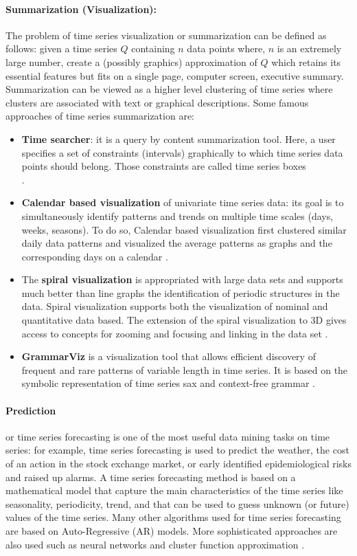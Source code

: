 \paragraph{Summarization (Visualization):}
The problem of time series visualization or summarization can be defined as follows: given a time series $Q$ containing $n$ data points where, $n$ is an extremely large number, create a (possibly graphics) approximation of $Q$ which retains its essential features but fits on a single page, computer screen, executive summary. Summarization can be viewed as a higher level clustering of time series  where clusters are associated with text or graphical descriptions. Some famous approaches of time series summarization  are:
\begin{itemize}

\item    \textbf{Time searcher}: it is a query by content summarization tool. Here, a user specifies a set of constraints (intervals) graphically to which time series data points should belong. Those constraints are called time series boxes \\ \cite{hochheiser2003interactive}.
\item    \textbf{Calendar based visualization} of univariate time series data: its goal is to simultaneously identify patterns and trends on multiple time scales (days, weeks, seasons). To do so, Calendar based visualization first clustered similar daily data patterns and visualized the average patterns as graphs and the corresponding days on a calendar \cite{van1999cluster}. 
\item    The \textbf{spiral visualization} is appropriated with large data sets and supports much better than line graphs the identification of periodic structures in the data. Spiral visualization supports both the visualization of nominal and quantitative data based. The extension of the spiral visualization to 3D gives access to concepts for zooming and focusing and linking in the data set \cite{weber2001visualizing}. 
\item    \textbf{GrammarViz} is a visualization tool that allows efficient discovery of frequent and rare patterns  of variable length in time series. It is based on the symbolic representation of time series sax and context-free grammar \cite{senin2014grammarviz}.
\end{itemize} 

\paragraph{Prediction} or time series forecasting is one of the most useful data mining tasks on time series: for example, time series forecasting is used to predict the weather, the cost of an action in the stock exchange market, or early identified epidemiological risks and raised up alarms. A time series forecasting method is based on a mathematical model that capture the main characteristics of the time series like seasonality, periodicity, trend, and that can be used to guess unknown (or future) values of the time series. Many other algorithms used for time series forecasting are based on Auto-Regressive (AR) models. More sophisticated approaches are also used such as neural networks and cluster function approximation \cite{mahalakshmi2016survey}.
